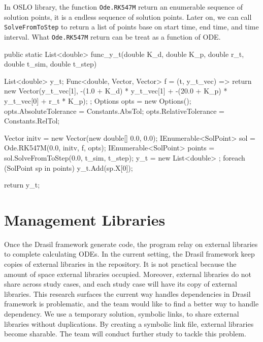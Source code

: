 In OSLO library, the function \verb|Ode.RK547M| return an enumerable sequence of solution points, it is a endless sequence of solution points. Later on, we can call \verb|SolveFromToStep| to return a list of points base on start time, end time, and time interval. What \verb|Ode.RK547M| return can be treat as a function of ODE.

\begin{listing}[ht]
\begin{csharp1}
public static List<double> func_y_t(double K_d, double K_p, double r_t, double t_sim, double t_step) {
    List<double> y_t;
    Func<double, Vector, Vector> f = (t, y_t_vec) => {
        return new Vector(y_t_vec[1], -(1.0 + K_d) * y_t_vec[1] + -(20.0 + K_p) * y_t_vec[0] + r_t * K_p);
    };
    Options opts = new Options();
    opts.AbsoluteTolerance = Constants.AbsTol;
    opts.RelativeTolerance = Constants.RelTol;
    
    Vector initv = new Vector(new double[] {0.0, 0.0});
    IEnumerable<SolPoint> sol = Ode.RK547M(0.0, initv, f, opts);
    IEnumerable<SolPoint> points = sol.SolveFromToStep(0.0, t_sim, t_step);
    y_t = new List<double> {};
    foreach (SolPoint sp in points) {
        y_t.Add(sp.X[0]);
    }
    
    return y_t;
}
\end{csharp1}
\label{code_csharposlo}
\end{listing}

\section{Management Libraries}
Once the Drasil framework generate code, the program relay on external libraries to complete calculating ODEs. In the current setting, the Drasil framework keep copies of external libraries in the repository. It is not practical because the amount of space external libraries occupied. Moreover, external libraries do not share across study cases, and each study case will have its copy of external libraries. This research surfaces the current way handles dependencies in Drasil framework is problematic, and the team would like to find a better way to handle dependency. We use a temporary solution, symbolic links, to share external libraries without duplications. By creating a symbolic link file, external libraries become sharable. The team will conduct further study to tackle this problem.
